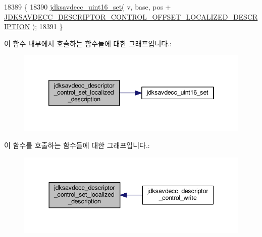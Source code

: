\begin{DoxyCode}
18389 \{
18390     \hyperlink{group__endian_ga14b9eeadc05f94334096c127c955a60b}{jdksavdecc\_uint16\_set}( v, base, pos + 
      \hyperlink{group__descriptor__control_ga89c7e79d9de6538a2bc5fd08eb0d9356}{JDKSAVDECC\_DESCRIPTOR\_CONTROL\_OFFSET\_LOCALIZED\_DESCRIPTION}
       );
18391 \}
\end{DoxyCode}


이 함수 내부에서 호출하는 함수들에 대한 그래프입니다.\+:
\nopagebreak
\begin{figure}[H]
\begin{center}
\leavevmode
\includegraphics[width=346pt]{group__descriptor__control_gad50d129165fa3deb69c5012e5a6a84c2_cgraph}
\end{center}
\end{figure}




이 함수를 호출하는 함수들에 대한 그래프입니다.\+:
\nopagebreak
\begin{figure}[H]
\begin{center}
\leavevmode
\includegraphics[width=344pt]{group__descriptor__control_gad50d129165fa3deb69c5012e5a6a84c2_icgraph}
\end{center}
\end{figure}


